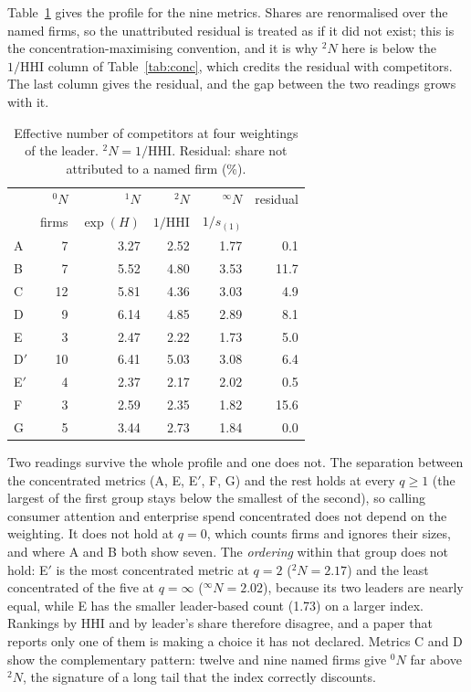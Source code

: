 \documentclass[11pt]{article}
\begin{document}
Table~\ref{tab:hill} gives the profile for the nine metrics. Shares are renormalised over the named firms, so the unattributed residual is treated as if it did not exist; this is the concentration-maximising convention, and it is why ${}^{2}N$ here is below the $1/\mathrm{HHI}$ column of Table~\ref{tab:conc}, which credits the residual with competitors. The last column gives the residual, and the gap between the two readings grows with it.

\begin{table}[h]
\centering\small
\caption{Effective number of competitors at four weightings of the leader. ${}^{2}N=1/\mathrm{HHI}$. Residual: share not attributed to a named firm (\%).}
\label{tab:hill}
\begin{tabular}{@{}lrrrrr@{}}
\toprule
& ${}^{0}N$ & ${}^{1}N$ & ${}^{2}N$ & ${}^{\infty}N$ & residual \\
& firms & $\exp(H)$ & $1/\mathrm{HHI}$ & $1/s_{(1)}$ & \\
\midrule
A & 7 & 3.27 & 2.52 & 1.77 & 0.1 \\
B & 7 & 5.52 & 4.80 & 3.53 & 11.7 \\
C & 12 & 5.81 & 4.36 & 3.03 & 4.9 \\
D & 9 & 6.14 & 4.85 & 2.89 & 8.1 \\
E & 3 & 2.47 & 2.22 & 1.73 & 5.0 \\
D$'$ & 10 & 6.41 & 5.03 & 3.08 & 6.4 \\
E$'$ & 4 & 2.37 & 2.17 & 2.02 & 0.5 \\
F & 3 & 2.59 & 2.35 & 1.82 & 15.6 \\
G & 5 & 3.44 & 2.73 & 1.84 & 0.0 \\
\bottomrule
\end{tabular}
\end{table}

Two readings survive the whole profile and one does not. The separation between the concentrated metrics (A, E, E$'$, F, G) and the rest holds at every $q\ge1$ (the largest of the first group stays below the smallest of the second), so calling consumer attention and enterprise spend concentrated does not depend on the weighting. It does not hold at $q=0$, which counts firms and ignores their sizes, and where A and B both show seven. The \emph{ordering} within that group does not hold: E$'$ is the most concentrated metric at $q=2$ (${}^{2}N=2.17$) and the least concentrated of the five at $q=\infty$ (${}^{\infty}N=2.02$), because its two leaders are nearly equal, while E has the smaller leader-based count (1.73) on a larger index. Rankings by HHI and by leader's share therefore disagree, and a paper that reports only one of them is making a choice it has not declared. Metrics C and D show the complementary pattern: twelve and nine named firms give ${}^{0}N$ far above ${}^{2}N$, the signature of a long tail that the index correctly discounts.
\end{document}
